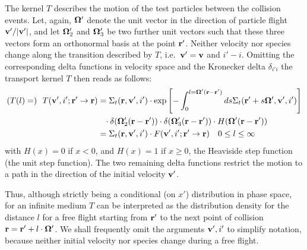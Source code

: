 The kernel $T$ describes the motion of the test particles between the collision
events.
Let, again,  $ \mathbf{\Omega}'$ denote the unit vector in the direction of particle
flight $\mathbf{v}'/|\mathbf{v}'|$, and let $ \mathbf{\Omega}_2'$ and $ \mathbf{\Omega}_3'$ be two further
unit vectors such that these three vectors  form an orthonormal basis at the
point $\mathbf{r}  '$.
Neither velocity nor species change along the transition described by $T$,
i.e.\ $\mathbf{v}'=\mathbf{v}$ and $i'-i$.
Omitting the corresponding delta functions in velocity space and the Kronecker
delta $\delta_{i'i}$ the transport kernel $T$ then reads as follows:
\begin{subequations}
  \begin{align}
    \label{eq1.5}
    (T(l)=)\ \ T ( \mathbf{v}', i'; \mathbf{r} ' \rightarrow	\mathbf{r} ) & = \Sigma_t ( \mathbf{r},\mathbf{v}',
    i') \cdot \exp \left [	  - \int_{0}^{l=\mathbf{\Omega}' ( \mathbf{r} - \mathbf{r} ' )} ds \Sigma_t (
      \mathbf{r} '  +  s \mathbf{\Omega}', \mathbf{v}', i' )  \right ] \nonumber                   \\
                                                    & \phantom{=} \cdot
    \delta (\mathbf{\Omega}_2' ( \mathbf{r}  -
    \mathbf{r} ' ))	\cdot \delta ( \mathbf{\Omega}_3'   (
    \mathbf{r} - \mathbf{r} ' ))
    \cdot   H (\mathbf{\Omega}'
    ( \mathbf{r}  - \mathbf{r}  ' ))
    \\
                                                    & = \Sigma_t ( \mathbf{r},\mathbf{v}',
    i') \cdot F( \mathbf{v}', i'; \mathbf{r} ' \rightarrow  \mathbf{r}
    ) \quad 0\le l \le \infty \label{2.8b}
  \end{align}
\end{subequations}
with $H(x) = 0 $ if $ x < 0 $, and $H(x) = 1 $ if $ x \ge 0$, the
Heaviside step function (the unit step function).
The two remaining delta functions restrict the motion to a path in the
direction of the initial velocity $\mathbf{v}'$.

Thus, although strictly being a conditional (on $x'$) distribution in phase
space, for an infinite medium $T$ can be interpreted as the distribution
density for the distance $l$ for a free flight starting from $\mathbf{r} '$ to the
next point of collision $\mathbf{r} = \mathbf{r} ' + l \cdot \mathbf{\Omega}'$.
We shall frequently omit the arguments $\mathbf{v}',i'$ to simplify notation, because
neither initial velocity nor species change during a free flight.

